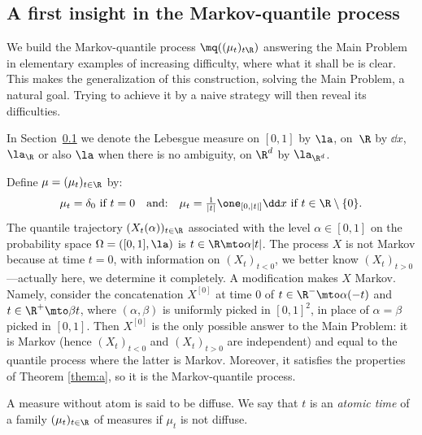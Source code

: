 \subsection{A first insight in the Markov-quantile process}\label{subsec:intro_quantilemarkovien}

We build the Markov-quantile process $\mq((\mu_t)_{t\R})$ answering the Main Problem in elementary examples of increasing difficulty, where what it shall be is clear. This makes the generalization of this construction, \ie solving the Main Problem, a natural goal. Trying to achieve it by a naive strategy will then reveal its difficulties.

\begin{notation}\label{not:leb}
In Section~\ref{subsec:intro_quantilemarkovien} we denote the Lebesgue measure on $[0,1]$ by $\la$, on~$\R$ by $\dd x$, $\la_\R$ or also $\la$ when there is no ambiguity, on $\R^d$ by $\la_{\R^d}$.
\end{notation}

\begin{ex}\label{ex1}Define $\mu=(\mu_t)_{t\in\R}$ by:
\[\textstyle\mu_t=\delta_0\ \text{if }t=0\quad \text{and:}\quad \mu_t=\frac{1}{|t|}\one_{[0,|t|]}\dd x\ \text{if }t\in \R\setminus \{0\}.\]
The quantile trajectory $(X_t(\alpha))_{t\in\R}$ associated with the level $\alpha\in [0,1]$ on the probability space $\Omega=([0,1],\la)$ is $t\in \R\mto \alpha|t|$. The process $X$ is not Markov because at time $t=0$, with information on $(X_t)_{t<0}$, we better know $(X_t)_{t>0}$---actually here, we determine it completely. A modification makes $X$ Markov. Namely, consider the concatenation $X^{[0]}$ at time $0$ of $t\in \R^-\mto\alpha(-t)$ and $t\in \R^+\mto\beta t$, where $(\alpha,\beta)$ is uniformly picked in $[0,1]^2$, in place of $\alpha=\beta$ picked in $[0,1]$. Then $X^{[0]}$ is the only possible answer to the Main Problem: it is Markov (hence $(X_t)_{t<0}$ and $(X_t)_{t>0}$ are independent) and equal to the quantile process where the latter is Markov. Moreover, it satisfies the properties of Theorem \ref{them:a}, so it is the Markov-quantile process.
\end{ex}

\begin{defi}\label{defi:atomic}A measure without atom is said to be diffuse. We say that $t$ is an \emph{atomic time} of a family $(\mu_t)_{t\in\R}$ of measures if $\mu_t$ is not diffuse.
\end{defi}


